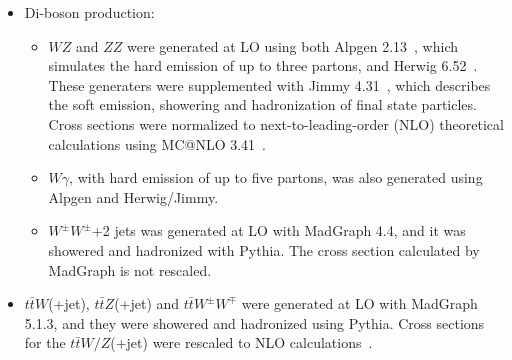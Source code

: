 \begin{itemize}
\item Di-boson production:
  \begin{itemize}
  \item $WZ$ and $ZZ$ were generated at LO using both {\sc Alpgen} 2.13~\cite{Mangano:2002ea}, which simulates the hard emission of up to three partons, and {\sc Herwig} 6.52~\cite{herwig1}.
    These generaters were supplemented with {\sc Jimmy} 4.31~\cite{JButterworth:1996zw}, which describes the soft emission, showering and hadronization of final state particles. 
    Cross sections were normalized to next-to-leading-order (NLO) theoretical calculations using {\sc MC@NLO} 3.41~\cite{Frixione:2002ik}.
  \item $W\gamma$, with hard emission of up to five partons, was also generated using {\sc Alpgen} and {\sc Herwig/Jimmy}.
  \item $W^{\pm}W^{\pm}$+2 jets was generated at LO with {\sc MadGraph} 4.4, and it was showered and hadronized with {\sc Pythia}. 
    The cross section calculated by {\sc MadGraph} is not rescaled.
  \end{itemize} 
\item $t\bar{t}W$(+jet), $t\bar{t}Z$(+jet) and $t\bar{t}W^{\pm}W^{\mp}$ were generated at LO with {\sc MadGraph} 5.1.3, and they were showered and hadronized using {\sc Pythia}. 
  Cross sections for the $t\bar{t}W/Z$(+jet) were rescaled to NLO calculations~\cite{Campbell:2012dh,Garzelli:2011is}.
\end{itemize}



